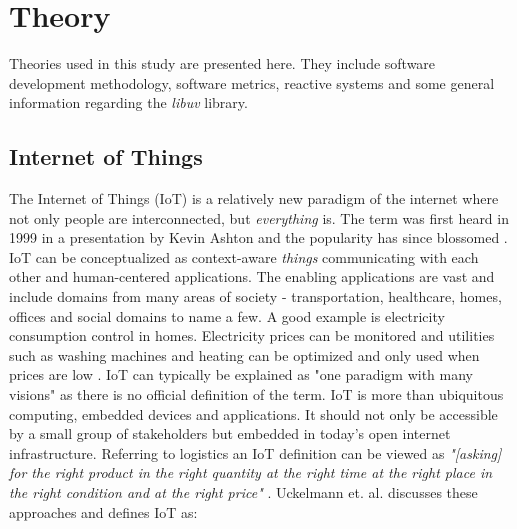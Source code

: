 \chapter{Theory}
\label{cha:theory}

Theories used in this study are presented here. They include software
development methodology, software metrics, reactive systems and some general
information regarding the \textit{libuv} library.

\section{Internet of Things}


The Internet of Things (IoT) is a relatively new paradigm of the internet where
not only people are interconnected, but \textit{everything} is. The term was
first heard in 1999 in a presentation by Kevin Ashton \cite{ashton2011internet}
and the popularity has since blossomed \cite{gubbi2013internet}. IoT can be
conceptualized as context-aware \textit{things} communicating with each other
and human-centered applications. The enabling applications are vast and include
domains from many areas of society - transportation, healthcare, homes, offices
and social domains to name a few. A good example is electricity consumption
control in homes. Electricity prices can be monitored and utilities such as
washing machines and heating can be optimized and only used when prices are low
\cite{atzori2010internet}. IoT can typically be explained as "one paradigm with
many visions" \cite{atzori2010internet} as there is no official definition of
the term. IoT is more than ubiquitous computing, embedded devices and
applications. It should not only be accessible by a small group of stakeholders
but embedded in today's open internet infrastructure. Referring to logistics an
IoT definition can be viewed as \textit{"[asking] for the right product in the
right quantity at the right time at the right place in the right condition and
at the right price"} \cite{uckelmann2011architectural}. Uckelmann et. al.
discusses these approaches and defines IoT as:

